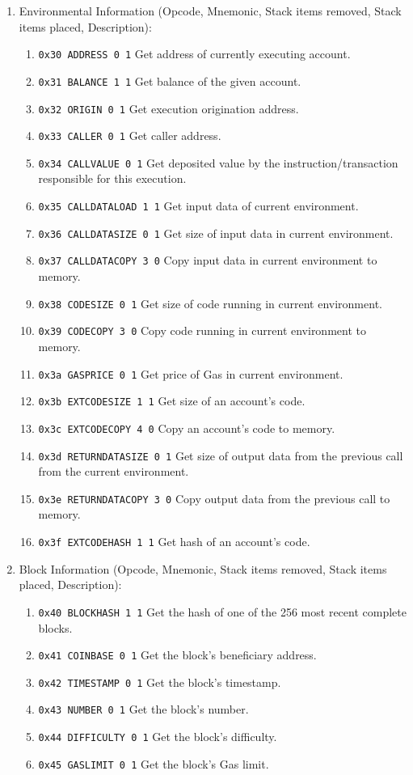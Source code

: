\begin{enumerate}
\item Environmental Information (Opcode, Mnemonic, Stack items removed, Stack items placed, Description):
\begin{enumerate}
\item\verb|0x30 ADDRESS 0 1| Get address of currently executing account.
\item\verb|0x31 BALANCE 1 1| Get balance of the given account.
\item\verb|0x32 ORIGIN 0 1| Get execution origination address.
\item\verb|0x33 CALLER 0 1| Get caller address.
\item\verb|0x34 CALLVALUE 0 1| Get deposited value by the instruction/transaction responsible for this execution.
\item\verb|0x35 CALLDATALOAD 1 1| Get input data of current environment.
\item\verb|0x36 CALLDATASIZE 0 1| Get size of input data in current environment.
\item\verb|0x37 CALLDATACOPY 3 0| Copy input data in current environment to memory.
\item\verb|0x38 CODESIZE 0 1| Get size of code running in current environment.
\item\verb|0x39 CODECOPY 3 0| Copy code running in current environment to memory.
\item\verb|0x3a GASPRICE 0 1| Get price of Gas in current environment.
\item\verb|0x3b EXTCODESIZE 1 1| Get size of an account's code.
\item\verb|0x3c EXTCODECOPY 4 0| Copy an account's code to memory.
\item\verb|0x3d RETURNDATASIZE 0 1| Get size of output data from the previous call from the current environment.
\item\verb|0x3e RETURNDATACOPY 3 0| Copy output data from the previous call to memory.
\item\verb|0x3f EXTCODEHASH 1 1| Get hash of an account's code.
\end{enumerate}

\item Block Information (Opcode, Mnemonic, Stack items removed, Stack items placed, Description):
\begin{enumerate}
\item\verb|0x40 BLOCKHASH 1 1| Get the hash of one of the 256 most recent complete blocks.
\item\verb|0x41 COINBASE 0 1| Get the block's beneficiary address.
\item\verb|0x42 TIMESTAMP 0 1| Get the block's timestamp.
\item\verb|0x43 NUMBER 0 1| Get the block's number.
\item\verb|0x44 DIFFICULTY 0 1| Get the block's difficulty.
\item\verb|0x45 GASLIMIT 0 1| Get the block's Gas limit.
\end{enumerate}


\end{enumerate}

